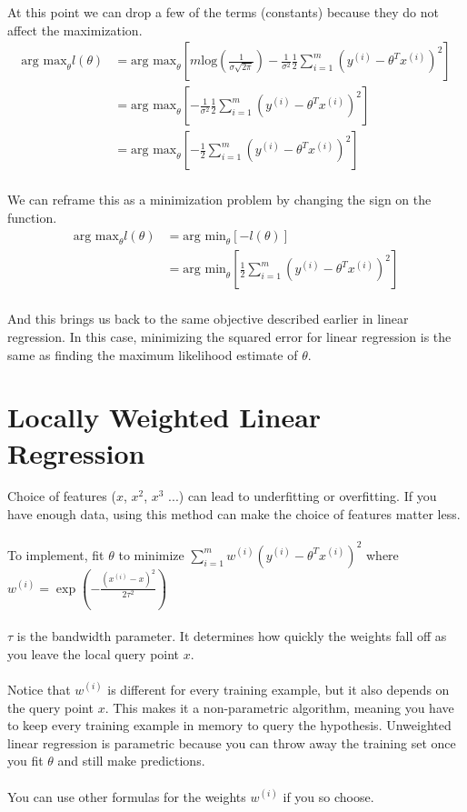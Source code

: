\documentclass{article}
\begin{document}
At this point we can drop a few of the terms (constants) because they do not affect the maximization.
\begin{align*}
\text{arg max}_\theta l(\theta) &= \text{arg max}_\theta [m\text{log} (\frac{1}{\sigma\sqrt{2\pi}}) -\frac{1}{\sigma^2}\frac{1}{2}\sum_{i=1}^m{(y^{(i)}-\theta^Tx^{(i)})}^2]\\
&= \text{arg max}_\theta [-\frac{1}{\sigma^2}\frac{1}{2}\sum_{i=1}^m{(y^{(i)}-\theta^Tx^{(i)})}^2]\\
&= \text{arg max}_\theta [-\frac{1}{2}\sum_{i=1}^m{(y^{(i)}-\theta^Tx^{(i)})}^2]\\
\end{align*}

We can reframe this as a minimization problem by changing the sign on the function.
\begin{align*}
\text{arg max}_\theta l(\theta) &= \text{arg min}_\theta [- l(\theta)]\\
&= \text{arg min}_\theta [\frac{1}{2}\sum_{i=1}^m{(y^{(i)}-\theta^Tx^{(i)})}^2]\\
\end{align*}

And this brings us back to the same objective described earlier in linear regression. In this case, minimizing the squared error for linear regression is the same as finding the maximum likelihood estimate of $\theta$.


\section{Locally Weighted Linear Regression}


Choice of features ($x$, $x^2$, $x^3$ ...) can lead to underfitting or overfitting. If you have enough data, using this method can make the choice of features matter less.\\
\\
To implement, fit $\theta$ to minimize $\sum_{i=1}^m w^{(i)}{(y^{(i)} - \theta^Tx^{(i)})}^2$ where 
$w^{(i)}=\exp(-\frac{{(x^{(i)} - x)}^2}{2\tau^2})$\\
\\
$\tau$ is the bandwidth parameter. It determines how quickly the weights fall off as you leave the local query point $x$.\\
\\
Notice that $w^{(i)}$ is different for every training example, but it also depends on the query point $x$. This makes it a non-parametric algorithm, meaning you have to keep every training example in memory to query the hypothesis. Unweighted linear regression is parametric because you can throw away the training set once you fit $\theta$ and still make predictions.\\
\\
You can use other formulas for the weights $w^{(i)}$ if you so choose.\\
\end{document}
